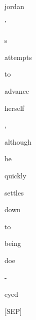 \documentclass[varwidth=150mm]{standalone}
\begin{document}
\begin{CJK*}{UTF8}{gbsn}
{{{\colorbox{red!53.349769592285156}{\strut jordan} \colorbox{red!3.58183217048645}{\strut '} \colorbox{red!2.353019952774048}{\strut s} \colorbox{red!0.0}{\strut attempts} \colorbox{red!1.1929606199264526}{\strut to} \colorbox{red!3.396899700164795}{\strut advance} \colorbox{red!3.089323043823242}{\strut herself} \colorbox{red!0.0}{\strut ,} \colorbox{red!1.4839870929718018}{\strut although} \colorbox{red!4.599459171295166}{\strut he} \colorbox{red!5.5282368659973145}{\strut quickly} \colorbox{red!3.0259578227996826}{\strut settles} \colorbox{red!0.0}{\strut down} \colorbox{red!5.62941312789917}{\strut to} \colorbox{red!3.3600387573242188}{\strut being} \colorbox{red!0.0}{\strut doe} \colorbox{red!5.743586540222168}{\strut -} \colorbox{red!11.623259544372559}{\strut eyed} \colorbox{red!1.580634355545044}{\strut [SEP]}
}}}
\end{CJK*}
\end{document}
